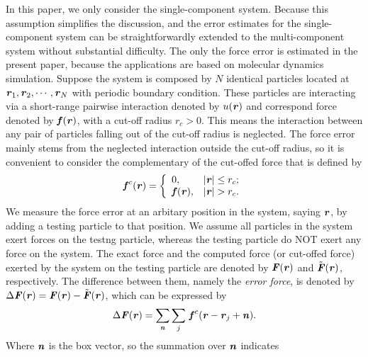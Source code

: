 \documentclass[aps,pre,preprint]{revtex4-1}
\renewcommand{\v}[1]{\textbf{\textit{#1}}}
\begin{document}
In this paper, we only consider the single-component system. Because
this assumption simplifies the discussion, and the error estimates for
the single-component system can be straightforwardly extended to the
multi-component system without substantial difficulty.  The only the
force error is estimated in the present paper, because the
applications are based on molecular dynamics simulation.
Suppose the system is composed by $N$ identical particles located at
$\v r_1, \v r_2, \cdots, \v r_N$ with periodic boundary condition.
 These particles are interacting via a
short-range pairwise interaction denoted by $u(\v r)$ and correspond
force denoted by $\v f(\v r)$, with a cut-off radius $r_c > 0$.  This
means the interaction between any pair of particles falling out of the
cut-off radius is neglected.
The force error mainly stems from the neglected interaction outside
the cut-off radius, so it is convenient to consider the complementary
of the cut-offed force that is defined by
\begin{align}
  \v f^c(\v r) =
  \left\{
  \begin{array}{ll}
    0, & \vert\v r\vert\leq r_c; \\
    \v f(\v r), & \vert\v r\vert > r_c.
  \end{array}
  \right.
\end{align}
We measure the force error at an arbitary position in the system,
saying $\v r$, by adding a testing particle to that position.  We
assume all particles in the system exert forces on the testng
particle, whereas the testing particle do NOT exert any force on the
system.  The exact force and the computed force (or cut-offed force)
exerted by the system on the testing particle are denoted by ${\v
  F}(\v r)$ and $\tilde{\v F}(\v r)$, respectively.  The difference
between them, namely the \emph{error force}, is denoted by $\Delta\v
F(\v r) = \v F(\v r) - \tilde{\v F}(\v r)$, which can be expressed by
\begin{align}
  \Delta\v F(\v r) = \sum_{\v n}\sum_{j}\, \v f^c(\v r - \v r_j + \v n).
\end{align}
Where $\v n$ is the box vector, so the summation over $\v n$ indicates
\end{document}
